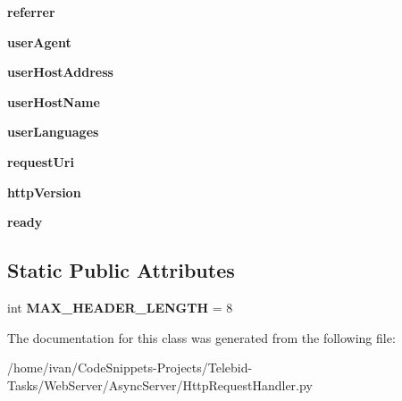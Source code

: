 \begin{DoxyCompactItemize}
\item 
\hypertarget{class_http_request_handler_1_1_http_request_aba42a32d838dae8eb146ee09a46df015}{{\bfseries referrer}}\label{class_http_request_handler_1_1_http_request_aba42a32d838dae8eb146ee09a46df015}

\item 
\hypertarget{class_http_request_handler_1_1_http_request_ae966be257b4bf488900e50244c9c685a}{{\bfseries user\-Agent}}\label{class_http_request_handler_1_1_http_request_ae966be257b4bf488900e50244c9c685a}

\item 
\hypertarget{class_http_request_handler_1_1_http_request_a6009e1c69c3865bbf50e81aa30dfff55}{{\bfseries user\-Host\-Address}}\label{class_http_request_handler_1_1_http_request_a6009e1c69c3865bbf50e81aa30dfff55}

\item 
\hypertarget{class_http_request_handler_1_1_http_request_abcfd7eff17c60a2037b9703f2ad94f33}{{\bfseries user\-Host\-Name}}\label{class_http_request_handler_1_1_http_request_abcfd7eff17c60a2037b9703f2ad94f33}

\item 
\hypertarget{class_http_request_handler_1_1_http_request_aefada851f3f8589e672abcce4631565a}{{\bfseries user\-Languages}}\label{class_http_request_handler_1_1_http_request_aefada851f3f8589e672abcce4631565a}

\item 
\hypertarget{class_http_request_handler_1_1_http_request_a83e7bf9c3f072cefebb6fe85d30baca2}{{\bfseries request\-Uri}}\label{class_http_request_handler_1_1_http_request_a83e7bf9c3f072cefebb6fe85d30baca2}

\item 
\hypertarget{class_http_request_handler_1_1_http_request_aa1a596471873ebb1bf6d63bd2f410bcc}{{\bfseries http\-Version}}\label{class_http_request_handler_1_1_http_request_aa1a596471873ebb1bf6d63bd2f410bcc}

\item 
\hypertarget{class_http_request_handler_1_1_http_request_a8e5e375e07703a121b490603b4695f28}{{\bfseries ready}}\label{class_http_request_handler_1_1_http_request_a8e5e375e07703a121b490603b4695f28}

\end{DoxyCompactItemize}
\subsection*{Static Public Attributes}
\begin{DoxyCompactItemize}
\item 
\hypertarget{class_http_request_handler_1_1_http_request_a950f8a27a420caf0382c2bf05b5b1cc3}{int {\bfseries M\-A\-X\-\_\-\-H\-E\-A\-D\-E\-R\-\_\-\-L\-E\-N\-G\-T\-H} = 8}\label{class_http_request_handler_1_1_http_request_a950f8a27a420caf0382c2bf05b5b1cc3}

\end{DoxyCompactItemize}


The documentation for this class was generated from the following file\-:\begin{DoxyCompactItemize}
\item 
/home/ivan/\-Code\-Snippets-\/\-Projects/\-Telebid-\/\-Tasks/\-Web\-Server/\-Async\-Server/Http\-Request\-Handler.\-py\end{DoxyCompactItemize}
